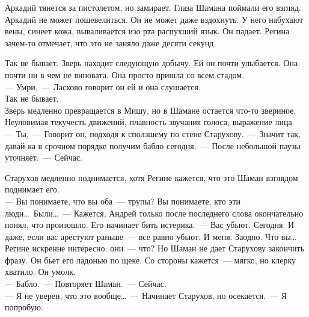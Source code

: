 Аркадий тянется за пистолетом, но замирает. Глаза Шамана поймали его взгляд. 
Аркадий не может пошевелиться. Он не может даже вздохнуть. У него набухают 
вены, синеет кожа, вываливается изо рта распухший язык. Он падает. Регина зачем-то 
отмечает, что это не заняло даже десяти секунд.

Так не бывает. Зверь находит следующую добычу. Ей он почти улыбается. Она почти 
ни в чем не виновата. Она просто пришла со всем стадом.\\
--- Умри,~--- Ласково говорит он ей и она слушается.\\

Так не бывает.\\

Зверь медленно превращается в Мишу, но в Шамане остается что-то звериное. 
Неуловимая текучесть движений, плавность звучания голоса, выражение лица.\\
--- Ты,~--- Говорит он, подходя к сползшему по стене Старухову.~--- Значит так, 
давай-ка в срочном порядке получим бабло сегодня.~--- После небольшой паузы 
уточняет.~--- Сейчас.

Старухов медленно поднимается, хотя Регине кажется, что это Шаман взглядом 
поднимает его.\\
--- Вы понимаете, что вы оба~--- трупы? Вы понимаете, кто эти 
люди\ldots\ Были\ldots~--- Кажется, Андрей только после последнего слова 
окончательно понял, что произошло. Его начинает бить истерика.~--- Вас убьют. 
Сегодня. И даже, если вас арестуют раньше~--- 
все равно убьют. И меня. Заодно. Что вы\ldots\-
Регине искренне интересно: они~--- что? Но Шаман не дает Старухову закончить 
фразу. Он бьет его ладонью по щеке. Со стороны кажется~--- мягко, но клерку 
хватило. Он умолк. \\
--- Бабло.~--- Повторяет Шаман.~--- Сейчас.\\
--- Я не уверен, что это вообще\ldots~--- Начинает Старухов, но осекается.~--- Я 
попробую.

